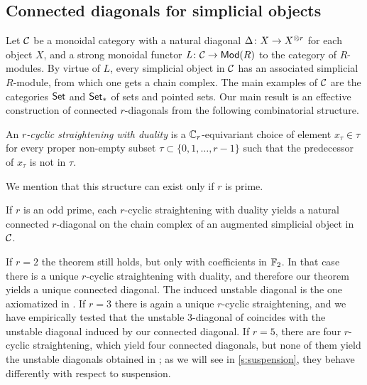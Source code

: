 \subsection{Connected diagonals for simplicial objects}

Let $\mathcal{C}$ be a monoidal category with a natural diagonal $\Delta \colon X \to X^{\otimes r}$ for each object $X$, and a strong monoidal functor $\operatorname{{\it L}} \colon \mathcal{C} \to \mathsf{Mod}(R)$ to the category of $R$-modules.
By virtue of $L$, every simplicial object in $\mathcal{C}$ has an associated simplicial $R$-module, from which one gets a chain complex.
The main examples of $\mathcal{C}$ are the categories $\mathsf{Set}$ and $\mathsf{Set}_*$ of sets and pointed sets.
Our main result is an effective construction of connected $r$-diagonals from the following combinatorial structure.

\begin{definition}
	An \emph{$r$-cyclic straightening with duality} is a $\mathbb{C}_r$-equivariant choice of element $x_\tau\in \tau$ for every proper non-empty subset $\tau \subset \{0,1,\dots,r-1\}$ such that the predecessor of $x_\tau$ is not in $\tau$.
\end{definition}

We mention that this structure can exist only if $r$ is prime.

\begin{theorem}\label{thm:main}
	If $r$ is an odd prime, each $r$-cyclic straightening with duality yields a natural connected $r$-diagonal on the chain complex of an augmented simplicial object in $\mathcal{C}$.
\end{theorem}

If $r=2$ the theorem still holds, but only with coefficients in $\mathbb{F}_2$.
In that case there is a unique $r$-cyclic straightening with duality, and therefore our theorem yields a unique connected diagonal.
The induced unstable diagonal is the one axiomatized in \cite{medina2022axiomatic}.
If $r = 3$ there is again a unique $r$-cyclic straightening, and we have empirically tested that the unstable $3$-diagonal of \cite{medina2021may_st} coincides with the unstable diagonal induced by our connected diagonal.
If $r = 5$, there are four $r$-cyclic straightening, which yield four connected diagonals, but none of them yield the unstable diagonals obtained in \cite{medina2021may_st}; as we will see in \cref{s:suspension}, they behave differently with respect to suspension.


